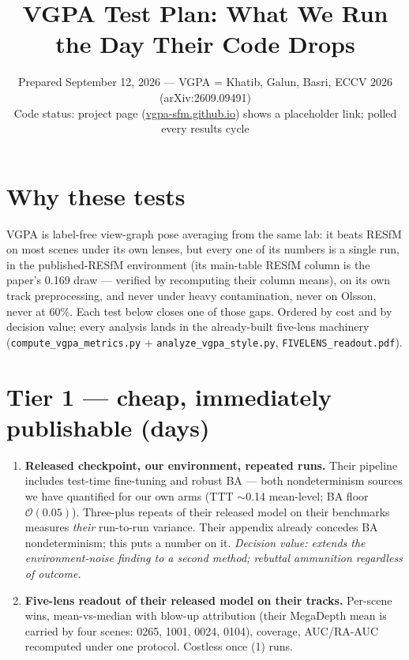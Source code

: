 \documentclass[11pt]{article}
\title{VGPA Test Plan: What We Run the Day Their Code Drops}
\author{Prepared September 12, 2026 --- VGPA = Khatib, Galun, Basri, ECCV 2026 (arXiv:2609.09491)\\
Code status: project page (\url{vgpa-sfm.github.io}) shows a placeholder link; polled every results cycle}
\date{}
\newcommand{\code}[1]{\texttt{\small #1}}
\begin{document}
\maketitle

\section*{Why these tests}
VGPA is label-free view-graph pose averaging from the same lab: it beats RESfM on most
scenes under its own lenses, but every one of its numbers is a single run, in the
published-RESfM environment (its main-table RESfM column is the paper's 0.169 draw ---
verified by recomputing their column means), on its own track preprocessing, and never
under heavy contamination, never on Olsson, never at 60\%. Each test below closes one of
those gaps. Ordered by cost and by decision value; every analysis lands in the
already-built five-lens machinery (\code{compute\_vgpa\_metrics.py} +
\code{analyze\_vgpa\_style.py}, \code{FIVELENS\_readout.pdf}).

\section*{Tier 1 --- cheap, immediately publishable (days)}
\begin{enumerate}[leftmargin=1.6em,itemsep=4pt]
\item \textbf{Released checkpoint, our environment, repeated runs.} Their pipeline
includes test-time fine-tuning and robust BA --- both nondeterminism sources we have
quantified for our own arms (TTT $\sim$0.14 mean-level; BA floor $\mathcal{O}(0.05)$).
Three-plus repeats of their released model on their benchmarks measures \emph{their}
run-to-run variance. Their appendix already concedes BA nondeterminism; this puts a
number on it. \emph{Decision value: extends the environment-noise finding to a second
method; rebuttal ammunition regardless of outcome.}
\item \textbf{Five-lens readout of their released model on their tracks.} Per-scene
wins, mean-vs-median with blow-up attribution (their MegaDepth mean is carried by four
scenes: 0265, 1001, 0024, 0104), coverage, AUC/RA-AUC recomputed under one protocol.
Costless once (1) runs.
\end{enumerate}
\end{document}
